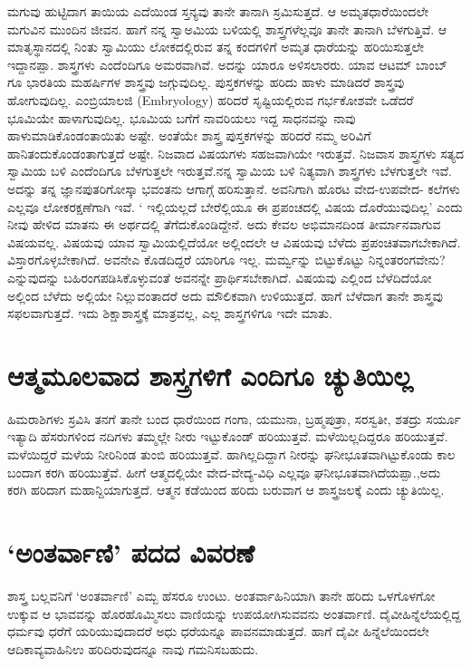ಮಗುವು ಹುಟ್ಟಿದಾಗ ತಾಯಿಯ ಎದೆಯಿಂಡ ಸ್ತನ್ಯವು ತಾನೇ ತಾನಾಗಿ ಸ್ರಮಿಸುತ್ತದೆ. ಆ ಅಮೃತಧಾರೆಯಿಂದಲೇ ಮಗುವಿನ ಮುಂದಿನ ಜೀವನ. ಹಾಗೆ ನನ್ನ ಸ್ವಾಅಮಿಯ ಬಳಿಯಲ್ಲಿ ಶಾಸ್ತ್ರಗಳೆಲ್ಲವೂ ತಾನೇ ತಾನಾಗಿ ಬೆಳಗುತ್ತಿವೆ. ಆ ಮಾತೃಸ್ಥಾನದಲ್ಲಿ ನಿಂತು ಸ್ವಾಮಿಯು ಲೋಕದಲ್ಲಿರುವ ತನ್ನ ಕಂದಗಳಿಗೆ ಅಮೃತ ಧಾರೆಯನ್ನು ಹರಿಯಿಸುತ್ತಲೇ ಇದ್ದಾನಪ್ಪಾ. ಶಾಸ್ತ್ರಗಳು ಎಂದೆಂದಿಗೂ ಅಮರವಾಗಿವೆ. ಅದನ್ನು  ಯಾರೂ ಅಳಿಸಲಾರರು. ಯಾವ ಆಟಮ್ ಬಾಂಬ್ ಗೂ ಭಾರತಿಯ ಮಹರ್ಷಿಗಳ ಶಾಸ್ತ್ರವು ಜಗ್ಗುವುದಿಲ್ಲ. ಪುಸ್ತಕಗಳನ್ನು ಹರಿದು ಹಾಳು ಮಾಡಿದರೆ ಶಾಸ್ತ್ರವು ಹೋಗುವುದಿಲ್ಲ.  ಎಂಬ್ರಿಯಾಲಜಿ (Embryology) ಹರಿದರೆ ಸೃಷ್ಟಿಯಲ್ಲಿರುವ ಗರ್ಭಕೋಶವೇ ಒಡೆದರೆ ಭೂಮಿಯೇ ಹಾಳಾಗುವುದಿಲ್ಲ. ಭೂಮಿಯ ಬಗೆಗೆ ನಾವರಿಯಲು ಇದ್ದ ಸಾಧನವನ್ನು ನಾವು ಹಾಳುಮಾಡಿಕೊಂಡಂತಾಯಿತು ಅಷ್ಟೇ. ಅಂತೆಯೇ ಶಾಸ್ತ್ರ ಪುಸ್ತಕಗಳನ್ನು  ಹರಿದರೆ ನಮ್ಮ ಅರಿವಿಗೆ ಹಾನಿತಂದುಕೊಂಡಂತಾಗುತ್ತದೆ ಅಷ್ಟೇ. ನಿಜವಾದ ವಿಷಯಗಳು ಸಹಜವಾಗಿಯೇ ಇರುತ್ತವೆ.  ನಿಜವಾಸ ಶಾಸ್ತ್ರಗಳು ಸತ್ಯದ ಸ್ವಾಮಿಯ ಬಳಿ ಎಂದೆಂದಿಗೂ ಬೆಳಗುತ್ತಲೇ ಇರುತ್ತವೆ.ನನ್ನ ಸ್ವಾಮಿಯ ಬಳಿ ನಿತ್ಯವಾಗಿ ಶಾಸ್ತ್ರಗಳು ಬೆಳಗುತ್ತಲೇ ಇವೆ. ಅದನ್ನು ತನ್ನ ಜ್ಞಾನಪುತರಿಗೋಸ್ಕಾ ಭವಂತನು ಆಗಾಗ್ಗೆ ಹರಿಸುತ್ತಾನೆ. ಅವನಿಗಾಗಿ ಹೊರಟ ವೇದ-ಉಪವೇದ- ಕಲೆಗಳು ಎಲ್ಲವೂ ಲೋಕರಕ್ಷಣೆಗಾಗಿ ಇವೆ. ` ಇಲ್ಲಿಯಲ್ಲದೆ ಬೇರೆಲ್ಲಿಯೂ ಈ ಪ್ರಪಂಚದಲ್ಲಿ ವಿಷಯ ದೊರೆಯುವುದಿಲ್ಲ' ಎಂದು ನೀವು ಹೇಳಿದ ಮಾತನು ಈ ಅರ್ಥದಲ್ಲಿ ತೆಗೆದುಕೊಂಡಿದ್ದೇನೆ. ಅದು ಕೇವಲ ಅಭಿಮಾನದಿಂಡ ತೀರ್ಮಾನವಾಗುವ ವಿಷಯವಲ್ಲ. ವಿಷಯವು ಯಾವ ಸ್ವಾಮಿಯಲ್ಲಿದೆಯೋ ಅಲ್ಲಿಂದಲೇ ಆ ವಿಷಯವು ಬೆಳೆದು ಪ್ರಪಂಚಿತವಾಗಬೇಕಾಗಿದೆ. ವಿಸ್ತಾರಗೊಳ್ಳಬೇಕಾಗಿದೆ. ಅವನೇಎ ಕೊಡದಿದ್ದರೆ ಯಾರಿಗೂ ಇಲ್ಲ. ಮರ್ಮ್ವನ್ನು ಬಿಟ್ಟುಕೊಟ್ಟು ನಿನ್ನಂತರಂಗವೇನು? ಎನ್ನುವುದನ್ನು ಬಹಿರಂಗಪಡಿಸಿಕೊಳ್ಳುವಂತೆ ಅವನನ್ನೇ ಪ್ರಾರ್ಥಿಸಬೇಕಾಗಿದೆ. ವಿಷಯವು ಎಲ್ಲಿಂದ ಬೆಳೆದಿದೆಯೋ ಅಲ್ಲಿಂದ ಬೆಳೆದು ಅಲ್ಲಿಯೇ ನಿಲ್ಲುವಂತಾದರೆ ಅದು ಮೌಲಿಕವಾಗಿ ಉಳಿಯುತ್ತದೆ. ಹಾಗೆ ಬೆಳೆದಾಗ ತಾನೇ ಶಾಸ್ತ್ರವು ಸಫಲವಾಗುತ್ತದೆ. ಇದು ಶಿಕ್ಷಾಶಾಸ್ತ್ರಕ್ಕೆ ಮಾತ್ರವಲ್ಲ, ಎಲ್ಲ ಶಾಸ್ತ್ರಗಳಿಗೂ ಇದೇ ಮಾತು. 

\section*{ಆತ್ಮಮೂಲವಾದ ಶಾಸ್ತ್ರಗಳಿಗೆ ಎಂದಿಗೂ ಚ್ಯುತಿಯಿಲ್ಲ}

ಹಿಮರಾಶಿಗಳು ಸ್ರವಿಸಿ ತನಗೆ ತಾನೇ ಬಂದ ಧಾರೆಯಿಂದ ಗಂಗಾ, ಯಮುನಾ, ಬ್ರಹ್ಮಪುತ್ರಾ, ಸರಸ್ವತೀ, ಶತದ್ರು ಸರ್ಯೂ ಇತ್ಯಾದಿ ಹೆಸರುಗಳಿಂದ ನದಿಗಳು ತಮ್ಮಲ್ಲೇ ನೀರು ಇಟ್ಟುಕೊಂಡ್ ಹರಿಯುತ್ತವೆ. ಮಳೆಯಿಲ್ಲದಿದ್ದರೂ ಹರಿಯುತ್ತವೆ. ಮಳೆಯಿದ್ದರೆ ಮಳೆಯ ನೀರಿನಿಂಡ ತುಂಬಿ ಹರಿಯುತ್ತವೆ. ಹಾಗಿಲ್ಲದಿದ್ದಾಗ ನೀರನ್ನು ಘನೀಭೂತವಾಗಿಟ್ಟುಕೊಂಡು ಕಾಲ ಬಂದಾಗ ಕರಗಿ ಹರಿಯುತ್ತೆವೆ. ಹೀಗೆ ಆತ್ಮದಲ್ಲಿಯೇ ವೇದ-ವೇದ್ಯ-ವಿಧಿ ಎಲ್ಲವೂ ಘನೀಭೂತವಾಗಿದೆಯಪ್ಪಾ.,ಅದು ಕರಗಿ ಹರಿದಾಗ ಮಹಾನ್ದಿಯಾಗುತ್ತದೆ. ಆತ್ಮನ ಕಡೆಯಿಂದ ಹರಿದು ಬರುವಾಗ ಆ ಶಾಸ್ತ್ರಜಲಕ್ಕೆ ಎಂದು ಚ್ಯುತಿಯಿಲ್ಲ.

\section*{`ಅಂತರ್ವಾಣಿ' ಪದದ ವಿವರಣೆ}

ಶಾಸ್ತ್ರ ಬಲ್ಲವನಿಗೆ `ಅಂತರ್ವಾಣಿ' ಎಮ್ಬ ಹೆಸರೂ ಉಂಟು. ಅಂತರ್ವಾಹಿನಿಯಾಗಿ ತಾನೇ ಹರಿದು ಒಳಗೊಳಗೋ ಉಕ್ಕುವ ಆ ಭಾವವನ್ನು ಹೊರಹೊಮ್ಮಿಸಲು ವಾಣಿಯನ್ನು ಉಪಯೋಗಿಸುವವನು ಅಂತರ್ವಾಣಿ. ದೈವೀಹಿನ್ನೆಲೆಯಲ್ಲಿದ್ದ ಧರ್ಮವು ಧರೆಗೆ ಯರಿಯುವುದಾದರೆ ಅಧು ಧರೆಯನ್ನೂ ಪಾವನಮಾಡುತ್ತದೆ. ಹಾಗೆ ದೈವೀ ಹಿನ್ನೆಲೆಯಿಂದಲೇ ಆದಿಕಾವ್ಯವಾಹಿನಿಉ ಹರಿದಿರುವುದನ್ನೂ ನಾವು ಗಮನಿಸಬಹುದು.

